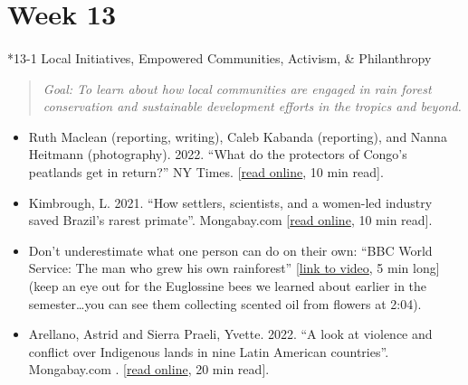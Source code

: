 \documentclass[
  10pt,
  letterpaper,
  oneside,
  open=any]{scrbook}
\makeatletter
\let\oldparagraph\paragraph
\renewcommand{\paragraph}{
    \@ifstar
      \xxxParagraphStar
      \xxxParagraphNoStar
  }
\newcommand{\xxxParagraphStar}[1]{\oldparagraph*{#1}\mbox{}}
\newcommand{\xxxParagraphNoStar}[1]{\oldparagraph{#1}\mbox{}}
\makeatother
\begin{document}
\section*{Week 13}\label{week-13}


\paragraph*{13-1 Local Initiatives, Empowered Communities, Activism, \&
Philanthropy}\label{local-initiatives-empowered-communities-activism-philanthropy}

\begin{quote}
\emph{Goal: To learn about how local communities are engaged in rain
forest conservation and sustainable development efforts in the tropics
and beyond.}
\end{quote}

\begin{itemize}
\item
  Ruth Maclean (reporting, writing), Caleb Kabanda (reporting), and
  Nanna Heitmann (photography). 2022. ``What do the protectors of
  Congo's peatlands get in return?'' NY Times.
  {[}\href{https://www.nytimes.com/interactive/2022/02/21/headway/peatlands-congo-climate-change.html}{read
  online}, 10 min read{]}.
\item
  Kimbrough, L. 2021. ``How settlers, scientists, and a women-led
  industry saved Brazil's rarest primate''. Mongabay.com
  {[}\href{https://news.mongabay.com/2021/05/how-settlers-scientists-and-a-women-led-industry-saved-brazils-rarest-primate/}{read
  online}, 10 min read{]}.
\item
  Don't underestimate what one person can do on their own: ``BBC World
  Service: The man who grew his own rainforest''
  {[}\href{https://www.youtube.com/watch?v=AngaeIf78AQ}{link to video},
  5 min long{]} (keep an eye out for the Euglossine bees we learned
  about earlier in the semester\ldots you can see them collecting
  scented oil from flowers at 2:04).
\item
  Arellano, Astrid and Sierra Praeli, Yvette. 2022. ``A look at violence
  and conflict over Indigenous lands in nine Latin American countries''.
  Mongabay.com .
  {[}\href{https://news.mongabay.com/2022/05/a-look-at-violence-and-conflict-over-indigenous-lands-in-nine-latin-american-countries/?utm_medium=Social&utm_source=Twitter\#Echobox=1654027741-1}{read
  online}, 20 min read{]}.
\end{itemize}
\end{document}

